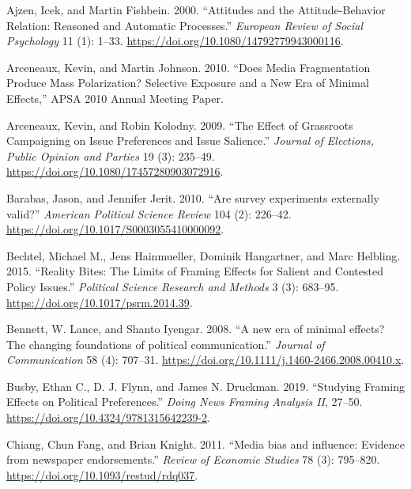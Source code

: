 \documentclass[
  12pt,
]{article}
\newlength{\cslhangindent}
\newlength{\cslentryspacingunit} %
\newenvironment{CSLReferences}[2] %
 {%
  \setlength{\parindent}{0pt}
  \ifodd #1
  \let\oldpar\par
  \def\par{\hangindent=\cslhangindent\oldpar}
  \fi
  \setlength{\parskip}{#2\cslentryspacingunit}
 }%
 {}
\begin{document}
\hypertarget{refs}{}
\begin{CSLReferences}{1}{0}
\leavevmode{}%
Ajzen, Icek, and Martin Fishbein. 2000. {``{Attitudes and the Attitude-Behavior Relation: Reasoned and Automatic Processes}.''} \emph{European Review of Social Psychology} 11 (1): 1--33. \url{https://doi.org/10.1080/14792779943000116}.

\leavevmode{}%
Arceneaux, Kevin, and Martin Johnson. 2010. {``{Does Media Fragmentation Produce Mass Polarization? Selective Exposure and a New Era of Minimal Effects},''} APSA 2010 Annual Meeting Paper.

\leavevmode{}%
Arceneaux, Kevin, and Robin Kolodny. 2009. {``{The Effect of Grassroots Campaigning on Issue Preferences and Issue Salience}.''} \emph{Journal of Elections, Public Opinion and Parties} 19 (3): 235--49. \url{https://doi.org/10.1080/17457280903072916}.

\leavevmode{}%
Barabas, Jason, and Jennifer Jerit. 2010. {``{Are survey experiments externally valid?}''} \emph{American Political Science Review} 104 (2): 226--42. \url{https://doi.org/10.1017/S0003055410000092}.

\leavevmode{}%
Bechtel, Michael M., Jens Hainmueller, Dominik Hangartner, and Marc Helbling. 2015. {``{Reality Bites: The Limits of Framing Effects for Salient and Contested Policy Issues}.''} \emph{Political Science Research and Methods} 3 (3): 683--95. \url{https://doi.org/10.1017/psrm.2014.39}.

\leavevmode{}%
Bennett, W. Lance, and Shanto Iyengar. 2008. {``{A new era of minimal effects? The changing foundations of political communication}.''} \emph{Journal of Communication} 58 (4): 707--31. \url{https://doi.org/10.1111/j.1460-2466.2008.00410.x}.

\leavevmode{}%
Busby, Ethan C., D. J. Flynn, and James N. Druckman. 2019. {``{Studying Framing Effects on Political Preferences}.''} \emph{Doing News Framing Analysis II}, 27--50. \url{https://doi.org/10.4324/9781315642239-2}.

\leavevmode{}%
Chiang, Chun Fang, and Brian Knight. 2011. {``{Media bias and influence: Evidence from newspaper endorsements}.''} \emph{Review of Economic Studies} 78 (3): 795--820. \url{https://doi.org/10.1093/restud/rdq037}.


\end{CSLReferences}
\end{document}
